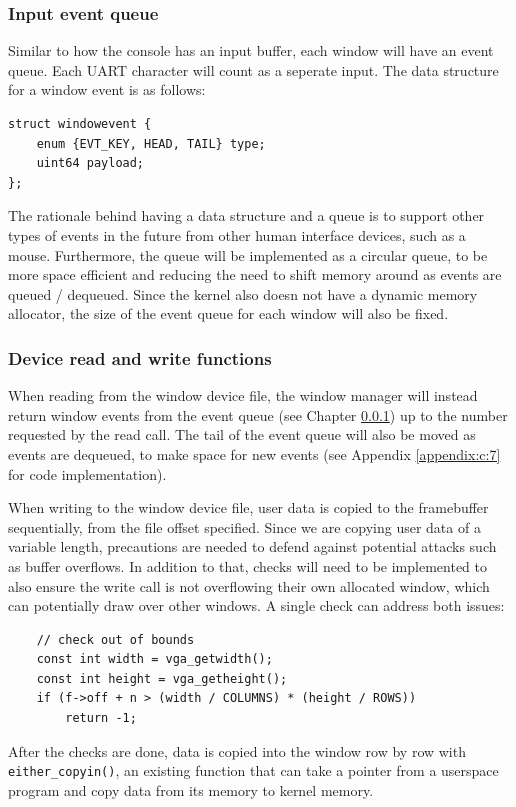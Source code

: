 \subsubsection{Input event queue}
\label{chapter2:impl:winman:evtq}
Similar to how the console has an input buffer, each window will have an event
queue. Each UART character will count as a seperate input. The data structure
for a window event is as follows:
\begin{verbatim}
struct windowevent {
    enum {EVT_KEY, HEAD, TAIL} type;
    uint64 payload;
};
\end{verbatim}
The rationale behind having a data structure and a queue is to support other
types of events in the future from other human interface devices, such as a mouse.
Furthermore, the queue will be implemented as a circular queue, to be more space
efficient and reducing the need to shift memory around as events are queued / dequeued.
Since the kernel also doesn not have a dynamic memory allocator, the size of the event
queue for each window will also be fixed.

\subsubsection{Device read and write functions}
When reading from the window device file, the window manager will instead return
window events from the event queue (see Chapter \ref{chapter2:impl:winman:evtq}) up
to the number requested by the read call. The tail of the event queue will also
be moved as events are dequeued, to make space for new events (see Appendix \ref{appendix:c:7} for code implementation).

When writing to the window device file, user data is copied to the framebuffer sequentially,
from the file offset specified. Since we are copying user data of a variable length,
precautions are needed to defend against potential attacks such as buffer overflows.
In addition to that, checks will need to be implemented to also ensure the write call
is not overflowing their own allocated window, which can potentially draw over
other windows. A single check can address both issues:

\begin{verbatim}
    // check out of bounds
    const int width = vga_getwidth();
    const int height = vga_getheight();
    if (f->off + n > (width / COLUMNS) * (height / ROWS))
        return -1;
\end{verbatim}

After the checks are done, data is copied into the window row by row with
\texttt{either_copyin()}, an existing function that can take a pointer
from a userspace program and copy data from its memory to kernel memory.

